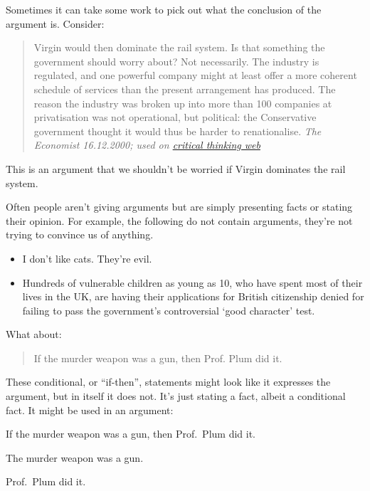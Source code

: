 Sometimes it can take some work to pick out what the conclusion of the argument is. 
Consider: 
\begin{quote}
Virgin would then dominate the rail system. Is that something the government should worry about? Not necessarily. The industry is regulated, and one powerful company might at least offer a more coherent schedule of services than the present arrangement has produced. The reason the industry was broken up into more than 100 companies at privatisation was not operational, but political: the Conservative government thought it would thus be harder to renationalise. \emph{The Economist 16.12.2000; used on \href{https://philosophy.hku.hk/think/arg/arg.php}{critical thinking web}}
\end{quote}
This is an argument that we shouldn't be worried if Virgin dominates the rail system. 

Often people aren't giving arguments but are simply presenting facts or stating their opinion.
For example, the following do not contain arguments, they're not trying to convince us of anything. 
\begin{itemize}
\item I don't like cats. They're evil.
\item Hundreds of vulnerable children as young as 10, who have spent most of their lives in the UK, are having their applications for British citizenship denied for failing to pass the government’s controversial `good character' test.
\end{itemize}
What about:\begin{quote}
 If the murder weapon was a gun, then Prof. Plum did it.
\end{quote}These conditional, or ``if-then'', statements might look like it expresses the argument, but in itself it does not. It's just stating a fact, albeit a conditional fact. It might be used in an argument:
\begin{earg}
\item If the murder weapon was a gun, then Prof.~Plum did it.
\item The murder weapon was a gun.
\item[\therefore] Prof.~Plum did it.
\end{earg}


